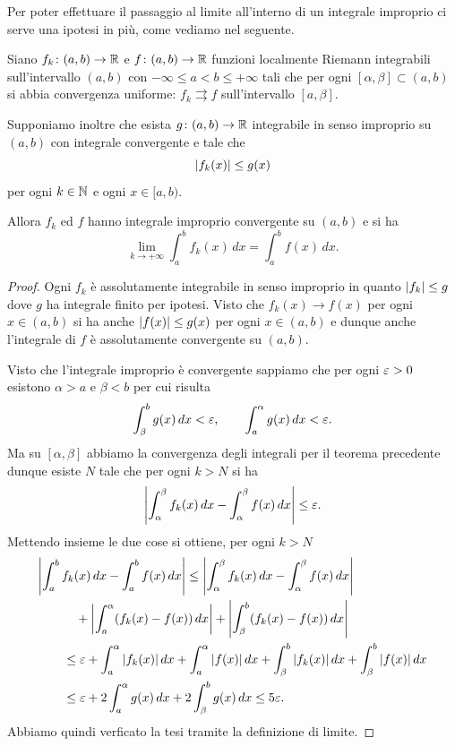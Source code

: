 Per poter effettuare il passaggio al limite all'interno di un integrale 
improprio ci serve una ipotesi in più, come vediamo nel seguente.

\begin{theorem}%
  \label{th:convergenza_dominata_uniforme}%
%
  Siano $f_k\colon (a,b) \to {\mathbb R}$ e $f\colon (a,b)\to {\mathbb R}$ funzioni 
  localmente Riemann integrabili
  sull'intervallo $(a,b)$ con $-\infty \le a < b \le +\infty$
  tali che per ogni $[\alpha,\beta]\subset (a,b)$ 
  si abbia convergenza uniforme: $f_k\rightrightarrows f$ 
  sull'intervallo $[a,\beta]$.
  
  Supponiamo inoltre che esista $g\colon (a,b)\to {\mathbb R}$
  integrabile in senso improprio su $(a,b)$ con integrale convergente e tale
  che
  \[
  {\left|f_k(x)\right|}\le g(x)
  \]
  per ogni $k\in {\mathbb N}$ e ogni $x\in [a,b)$.
    
  Allora $f_k$ ed $f$ hanno integrale improprio convergente su $(a,b)$ e si ha
  \[
    \lim_{k\to+\infty} \int_a^b f_k(x)\, dx = \int_a^b f(x)\, dx.
  \]
\end{theorem}
%
\begin{proof}
  Ogni $f_k$ è assolutamente integrabile in senso improprio in quanto
  ${\left|f_k\right|}\le g$ dove $g$ ha integrale finito per ipotesi.
  Visto che $f_k(x)\to f(x)$ per ogni  $x\in (a,b)$
  si ha anche ${\left|f(x)\right|}\le g(x)$ per ogni $x\in (a,b)$ 
  e dunque anche l'integrale di $f$ è assolutamente convergente su $(a,b)$.
  
  Visto che l'integrale improprio è convergente sappiamo che 
  per ogni $\varepsilon>0$ esistono $\alpha>a$ e $\beta<b$ per cui risulta
  \[
    \int_\beta^b g(x)\, dx < \varepsilon, \qquad 
    \int_a^\alpha g(x)\, dx < \varepsilon.
  \]
  Ma su $[\alpha ,\beta]$ abbiamo la convergenza degli integrali per il teorema precedente
  dunque esiste $N$ tale che per ogni $k > N$ si ha 
  \[
   {\left|\int_\alpha^\beta f_k(x)\, dx - \int_\alpha^\beta f(x)\, dx\right|} \le \varepsilon. 
  \]
  Mettendo insieme le due cose si ottiene,
  per ogni $k>N$
  \begin{align*}
    \MoveEqLeft{\abs{\int_a^b f_k(x)\, dx - \int_a^b f(x)\, dx}} \le \abs{\int_\alpha^\beta f_k(x)\, dx - \int_\alpha^\beta f(x)\, dx} \\
    & \quad + \abs{\int_a^\alpha (f_k(x) - f(x))\, dx }
      + \abs{\int_\beta^b (f_k(x) - f(x))\, dx } \\
    &\le \eps 
    + \int_a^\alpha \abs{f_k(x)}\, dx + \int_a^\alpha\abs{f(x)}\, dx
    + \int_\beta^b \abs{f_k(x)}\, dx + \int_\beta^b\abs{f(x)}\, dx\\
    &\le \eps 
    + 2 \int_a^\alpha g(x)\,dx
    + 2 \int_\beta^b g(x)\,dx 
    \le 5 \eps.
  \end{align*}
  Abbiamo quindi verficato la tesi tramite la definizione di limite.
\end{proof}

